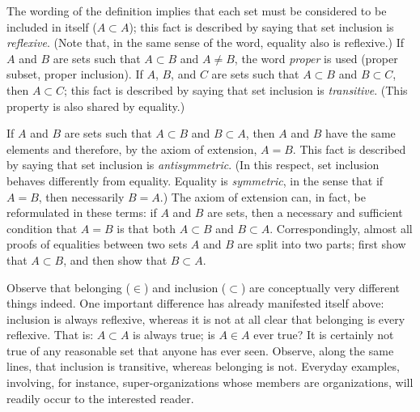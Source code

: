  The wording of the definition implies that each set must be considered to be included in itself ($A \subset A$); this fact is described by saying that set inclusion is \textit{reflexive}. (Note that, in the same sense of the word, equality also is reflexive.) 
 If $A$ and $B$ are sets such that $A \subset B$ and $A \neq B$, the word \textit{proper} is used (proper subset, proper inclusion). 
 If $A$, $B$, and $C$ are sets such that $A \subset B$ and $B \subset C$, then $A \subset C$; this fact is described by saying that set inclusion is \textit{transitive}. 
 (This property is also shared by equality.)


  If $A$ and $B$ are sets such that $A \subset B$ and $B \subset A$, then $A$ and $B$ have the same elements and therefore, by the axiom of extension, $A = B$. 
 This fact is described by saying that set inclusion is \textit{antisymmetric}. 
 (In this respect, set inclusion behaves differently from equality. 
 Equality is \textit{symmetric}, in the sense that if $A = B$, then necessarily $B = A$.) 
 The axiom of extension can, in fact, be reformulated in these terms: if $A$ and $B$ are sets, then a necessary and sufficient condition that $A = B$ is that both $A \subset B$ and $B \subset A$. 
 Correspondingly, almost all proofs of equalities between two sets $A$ and $B$ are split into two parts; first show that $A \subset B$, and then show that $B \subset A$.


  Observe that belonging ($\in$) and inclusion ($\subset$) are conceptually very different things indeed. 
 One important difference has already manifested itself above: inclusion is always reflexive, whereas it is not at all clear that belonging is every reflexive. 
 That is: $A \subset A$ is always true; is $A \in A$ ever true? 
 It is certainly not true of any reasonable set that anyone has ever seen. 
 Observe, along the same lines, that inclusion is transitive, whereas belonging is not. 
 Everyday examples, involving, for instance, super-organizations whose members are organizations, will readily occur to the interested reader.
